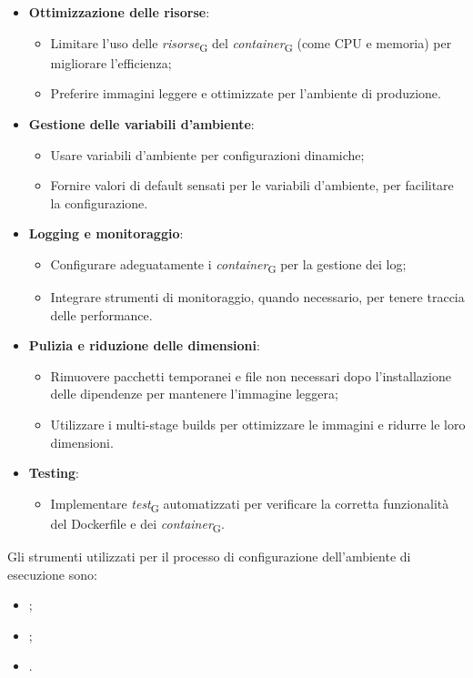 \begin{itemize}
\begin{itemize}
    \end{itemize}
    \item \textbf{Ottimizzazione delle risorse}:
    \begin{itemize}
        \item Limitare l'uso delle \textit{risorse}\textsubscript{G} del \textit{container}\textsubscript{G} (come CPU e memoria) per migliorare l'efficienza;
        \item Preferire immagini leggere e ottimizzate per l'ambiente di produzione.
    \end{itemize}
    \item \textbf{Gestione delle variabili d'ambiente}:
    \begin{itemize}
        \item Usare variabili d'ambiente per configurazioni dinamiche;
        \item Fornire valori di default sensati per le variabili d'ambiente, per facilitare la configurazione.
    \end{itemize}
    \item \textbf{Logging e monitoraggio}:
    \begin{itemize}
        \item Configurare adeguatamente i \textit{container}\textsubscript{G} per la gestione dei log;
        \item Integrare strumenti di monitoraggio, quando necessario, per tenere traccia delle performance.
    \end{itemize}
    \item \textbf{Pulizia e riduzione delle dimensioni}:
    \begin{itemize}
        \item Rimuovere pacchetti temporanei e file non necessari dopo l'installazione delle dipendenze per mantenere l'immagine leggera;
        \item Utilizzare i multi-stage builds per ottimizzare le immagini e ridurre le loro dimensioni.
    \end{itemize}
    \item \textbf{Testing}:
    \begin{itemize}
        \item Implementare \textit{test}\textsubscript{G} automatizzati per verificare la corretta funzionalità del Dockerfile e dei \textit{container}\textsubscript{G}.
    \end{itemize}
\end{itemize}

Gli strumenti utilizzati per il processo di configurazione dell'ambiente di esecuzione sono:
\begin{itemize}
    \item {};
    \item {};
    \item {}.
\end{itemize}

